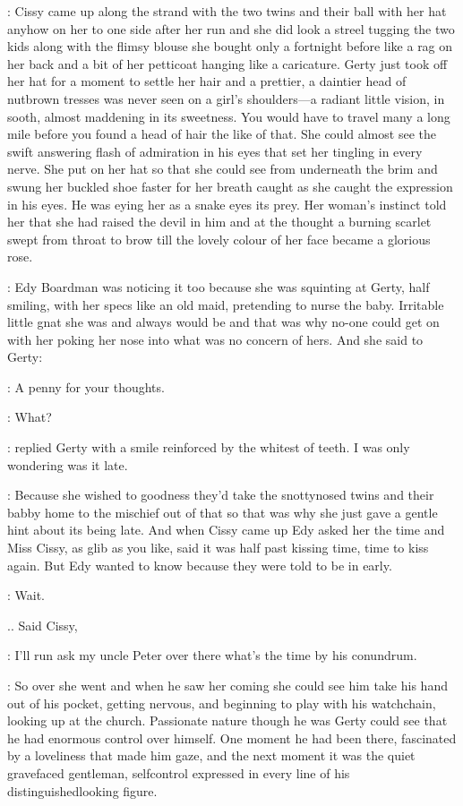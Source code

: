 :
Cissy came up along the strand with the two twins and their ball with
her hat anyhow on her to one side after her run and she did look a streel
tugging the two kids along with the flimsy blouse she bought only a
fortnight before like a rag on her back and a bit of her petticoat hanging
like a caricature. Gerty just took off her hat for a moment to settle her
hair and a prettier, a daintier head of nutbrown tresses was never seen on
a girl's shoulders—a radiant little vision, in sooth, almost maddening in
its sweetness. You would have to travel many a long mile before you found
a head of hair the like of that. She could almost see the swift answering
flash of admiration in his eyes that set her tingling in every nerve.
She put on her hat so that she could see from underneath the brim and
swung her buckled shoe faster for her breath caught as she caught the
expression in his eyes. He was eying her as a snake eyes its prey. Her
woman's instinct told her that she had raised the devil in him and at the
thought a burning scarlet swept from throat to brow till the lovely colour
of her face became a glorious rose.

:
Edy Boardman was noticing it too because she was squinting at Gerty,
half smiling, with her specs like an old maid, pretending to nurse the
baby. Irritable little gnat she was and always would be and that was why
no-one could get on with her poking her nose into what was no concern of
hers. And she said to Gerty:

\edy:
A penny for your thoughts.

\gerty:
What?

:
replied Gerty with a smile reinforced by the whitest of teeth.
I was only wondering was it late.

:
Because she wished to goodness they'd take the snottynosed twins and their
babby home to the mischief out of that so that was why she just gave a
gentle hint about its being late. And when Cissy came up Edy asked her the
time and Miss Cissy, as glib as you like, said it was half past kissing
time, time to kiss again. But Edy wanted to know because they were told to
be in early.

\cissy:
Wait.

.. Said Cissy,

\cissy:
I'll run ask my uncle Peter over there what's the time
by his conundrum.

:
So over she went and when he saw her coming she could see him take his
hand out of his pocket, getting nervous, and beginning to play with his
watchchain, looking up at the church. Passionate nature though he was
Gerty could see that he had enormous control over himself. One moment he
had been there, fascinated by a loveliness that made him gaze, and the
next moment it was the quiet gravefaced gentleman, selfcontrol expressed
in every line of his distinguishedlooking figure.

